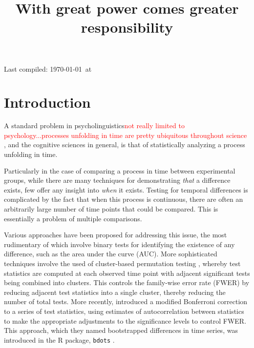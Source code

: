 \documentclass{article}
\title{With great power comes greater responsibility}
\date{}
\newcommand{\xt}{\texttt}
\providecommand{\pb}[1]{\textcolor{red}{#1}}
\begin{document}

\maketitle

Last compiled: \today \  at \currenttime


%


\section{Introduction}

A standard problem in psycholinguistics\pb{not really limited to psychology...processes unfolding in time are pretty ubiquitous throughout science} , and the cognitive sciences in general, is that of statistically analyzing a process unfolding in time. 

Particularly in the case of comparing a process in time between experimental groups, while there are many techniques for demonstrating \textit{that} a difference exists, few offer any insight into \textit{when} it exists. Testing for temporal differences is complicated by the fact that when this process is continuous, there are often an arbitrarily large number of time points that could be compared. This is essentially a problem of multiple comparisons.

Various approaches have been proposed for addressing this issue, the most rudimentary of which involve binary tests for identifying the existence of any difference, such as the area under the curve (AUC).  More sophisticated techniques involve the used of cluster-based permutation testing \citep{Maris2007}, whereby test statistics are computed at each observed time point with adjacent significant tests being combined into clusters. This controls the family-wise error rate (FWER) by reducing adjacent test statistics into a single cluster, thereby reducing the number of total tests. More recently, \citet{oleson2017detecting} introduced a modified Bonferroni correction to a series of test statistics, using estimates of autocorrelation between statistics to make the appropriate adjustments to the significance levels to control FWER. This approach, which they named bootstrapped differences in time series, was introduced in the R package, \xt{bdots} \citep{seedorff2018bdots}.
\end{document}
